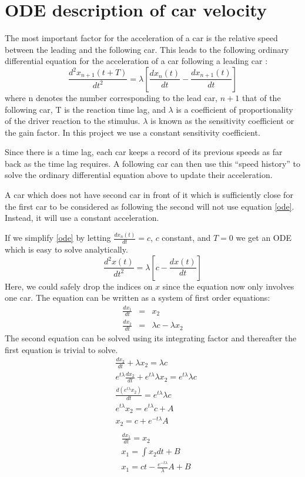 \documentclass[11pt,a4paper]{article}
\begin{document}
\section{ODE description of car velocity}
The most important factor for the acceleration of a car is the relative speed between the leading and
the following car. This leads to the following ordinary differential equation for the acceleration of a car following a leading car \cite{gazis}:
\begin{equation}
\label{ode}
\frac{d^2 x_{n+1}(t + T)}{dt^2} = \lambda \left[ \frac{dx_n(t)}{dt} - \frac{dx_{n+1}(t)}{dt} \right] 
\end{equation}
where n denotes the number corresponding to the lead car, $n+1$ that of the
following car, T is the reaction time lag, and $\lambda$ is a coefficient of
proportionality of the driver reaction to the stimulus. $\lambda$ is known
as the sensitivity coefficient or the gain factor.
In this project we use a constant sensitivity coefficient.

Since there is a time lag, each car keeps a record of its previous speeds
as far back as the time lag requires. A following car can then use this
``speed history'' to solve the ordinary differential equation above to
update their acceleration.

A car which does not have second car in front of it which is sufficiently
close for the first car to be considered as following the second will not
use equation \ref{ode}. Instead, it will use a constant acceleration.

If we simplify \ref{ode} by letting $\frac{dx_n(t)}{dt}=c$, $c$ constant, and
$T=0$ we get an ODE which is easy to solve analytically.
$$
\frac{d^2 x(t)}{dt^2} = \lambda \left[ c - \frac{dx(t)}{dt} \right] 
$$
Here, we could safely drop the indices on $x$ since the equation now only
involves one car. The equation can be written as a system of first order
equations:
\begin{eqnarray*}
\frac{dx_1}{dt} &=& x_2 \\
\frac{dx_2}{dt} &=& \lambda c - \lambda x_2
\end{eqnarray*}
The second equation can be solved using its integrating factor and thereafter
the first equation is trivial to solve.
\begin{eqnarray*}
&\frac{dx_2}{dt} + \lambda x_2 = \lambda c \\
&e^{t\lambda}\frac{dx_2}{dt}+e^{t\lambda}\lambda x_2 = e^{t\lambda}\lambda c \\
&\frac{d\left(e^{t\lambda}x_2\right)}{dt} = e^{t\lambda}\lambda c \\
&e^{t\lambda}x_2 = e^{t\lambda}c + A \\
&x_2 = c + e^{-t\lambda}A \\
\end{eqnarray*}
\begin{eqnarray*}
&\frac{dx_1}{dt}=x_2 \\
&x_1 = \int x_2 dt + B \\
&x_1 = ct - \frac{e^{-t\lambda}}{\lambda}A + B
\end{eqnarray*}
\end{document}
